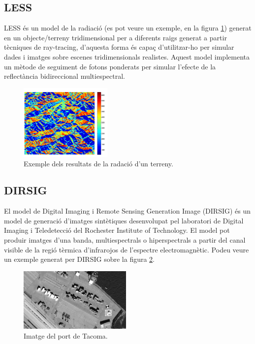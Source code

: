 \documentclass[10pt,a4paper,twocolumn,twoside]{article}
\begin{document}
\subsection{LESS}

LESS és un model de la radiació (es pot veure un exemple, en la figura \ref{fig-lessradiacio}) generat en un objecte/terreny tridimensional per a diferents raigs generat a partir tècniques de ray-tracing, d'aquesta forma és capaç d'utilitzar-ho per simular dades i imatges sobre escenes tridimensionals realistes. Aquest model implementa un mètode de seguiment de fotons ponderats per simular l'efecte de la reflectància bidireccional multiespectral.

\begin{figure}[!h]
\centering
  	\includegraphics[width=0.4\textwidth]{lessradiacio}
	\caption{Exemple dels resultats de la radació d'un terreny.}
	\label{fig-lessradiacio}
\end{figure}

\subsection{DIRSIG}
El model de Digital Imaging i Remote Sensing Generation Image (DIRSIG) és un model de generació d'imatges sintètiques desenvolupat pel laboratori de Digital Imaging i Teledetecció del Rochester Institute of Technology. El model pot produir imatges d'una banda, multiespectrals o hiperspectrals a partir del canal visible de la regió tèrmica d'infrarojos de l'espectre electromagnètic. Podeu veure un exemple generat per DIRSIG sobre la figura \ref{fig-tacoma}.

\begin{figure}[!h]
\centering
  	\includegraphics[width=0.49\textwidth]{tacoma}
	\caption{Imatge del port de Tacoma.}
	\label{fig-tacoma}
\end{figure}
\end{document}

